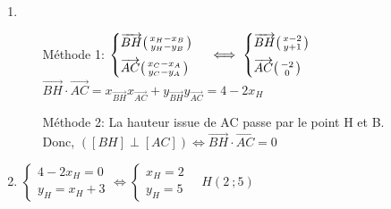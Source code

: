 \documentclass[12pt, a4paper]{article}
\begin{document}
\begin{Exercise}[number={79}]
\begin{enumerate}[1)]
\begin{enumerate}[a)]
          \end{enumerate}
    \item \begin{itemize}[leftmargin=3cm]
            \item[Méthode 1:] $\begin{cases}\overrightarrow{BH}\begin{psmallmatrix}x_H-x_B\\y_H-y_B\end{psmallmatrix}\\[0.2cm]\overrightarrow{AC}\begin{psmallmatrix}x_C-x_A\\y_C-y_A\end{psmallmatrix}\end{cases}\iff\begin{cases}\overrightarrow{BH}\begin{psmallmatrix}x-2\\y+1\end{psmallmatrix}\\[0.2cm]\overrightarrow{AC}\begin{psmallmatrix}-2\\0\end{psmallmatrix}\end{cases}$ \medbreak $\overrightarrow{BH}\cdot\overrightarrow{AC}=x_{\overrightarrow{BH}}x_{\overrightarrow{AC}}+y_{\overrightarrow{BH}}y_{\overrightarrow{AC}}=4-2x_H$ \medbreak
            \item[Méthode 2:] La hauteur issue de AC passe par le point H et B. \\ Donc, \quad $([BH]\perp[AC])\iff\overrightarrow{BH}\cdot\overrightarrow{AC}=0$
          \end{itemize}
    \item $\begin{cases}4-2x_H=0\\[0.2cm]y_H=x_H+3\end{cases}\iff\begin{cases}x_H=2\\[0.2cm]y_H=5\end{cases} \quad H(2\ ;5)$
  \end{enumerate}
\end{Exercise}
\end{document}
